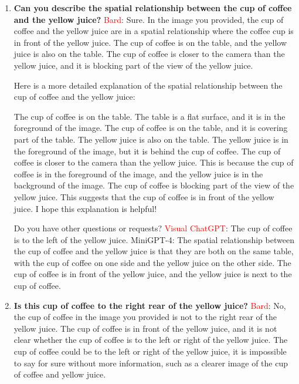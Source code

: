 \begin{enumerate}
    \item \textbf{Can you describe the spatial relationship between the cup of coffee and the yellow juice?}
    \subitem \textcolor{Red}{Bard}: 
    Sure. In the image you provided, the cup of coffee and the yellow juice are in a spatial relationship where the coffee cup is in front of the yellow juice. The cup of coffee is on the table, and the yellow juice is also on the table. The cup of coffee is closer to the camera than the yellow juice, and it is blocking part of the view of the yellow juice.
    
    Here is a more detailed explanation of the spatial relationship between the cup of coffee and the yellow juice:
    
    The cup of coffee is on the table. The table is a flat surface, and it is in the foreground of the image. The cup of coffee is on the table, and it is covering part of the table.
    The yellow juice is also on the table. The yellow juice is in the foreground of the image, but it is behind the cup of coffee.
    The cup of coffee is closer to the camera than the yellow juice. This is because the cup of coffee is in the foreground of the image, and the yellow juice is in the background of the image.
    The cup of coffee is blocking part of the view of the yellow juice. This suggests that the cup of coffee is in front of the yellow juice.
    I hope this explanation is helpful!
    
    Do you have other questions or requests?
    \subitem \textcolor{red}{Visual ChatGPT}: The cup of coffee is to the left of the yellow juice.
    \subitem MiniGPT-4: The spatial relationship between the cup of coffee and the yellow juice is that they are both on the same table, with the cup of coffee on one side and the yellow juice on the other side. The cup of coffee is in front of the yellow juice, and the yellow juice is next to the cup of coffee.
    \item \textbf{Is this cup of coffee to the right rear of the yellow juice?}
    \subitem \textcolor{Red}{Bard}: 
    No, the cup of coffee in the image you provided is not to the right rear of the yellow juice. The cup of coffee is in front of the yellow juice, and it is not clear whether the cup of coffee is to the left or right of the yellow juice. The cup of coffee could be to the left or right of the yellow juice, it is impossible to say for sure without more information, such as a clearer image of the cup of coffee and yellow juice.


\end{enumerate}
